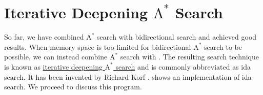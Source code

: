 \section{Iterative Deepening $\mathrm{A}^*$ Search \label{sec:ida-star-search}}
So far, we have combined $\mathrm{A}^*$ search with bidirectional search and achieved good results.  When
memory space is too limited for bidirectional $\mathrm{A}^*$ search to be possible, we can instead
combine $\mathrm{A}^*$ search with .  The resulting search technique is known as
\href{https://en.wikipedia.org/wiki/Iterative_deepening_A*}{\color{blue}iterative deepening $\mathrm{A}^*$ search}
and is commonly abbreviated as  \ac{ida} search.  
It has been invented by Richard Korf \cite{korf:1985}.
shows an implementation of \ac{ida} search.  We proceed to discuss this program.

